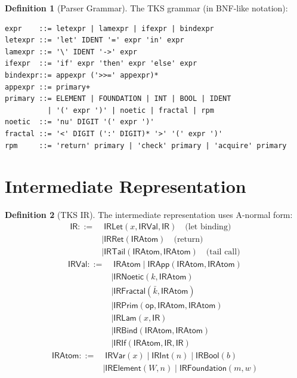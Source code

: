 \documentclass[11pt,twoside,openright]{book}
\theoremstyle{definition}
\newtheorem{definition}{Definition}[chapter]
\theoremstyle{plain}
\theoremstyle{remark}
\newcommand{\IR}{\mathsf{IR}}                %
\begin{document}
\begin{definition}[Parser Grammar]
\label{def:parser-grammar}
The TKS grammar (in BNF-like notation):
\begin{verbatim}
expr    ::= letexpr | lamexpr | ifexpr | bindexpr
letexpr ::= 'let' IDENT '=' expr 'in' expr
lamexpr ::= '\' IDENT '->' expr
ifexpr  ::= 'if' expr 'then' expr 'else' expr
bindexpr::= appexpr ('>>=' appexpr)*
appexpr ::= primary+
primary ::= ELEMENT | FOUNDATION | INT | BOOL | IDENT
          | '(' expr ')' | noetic | fractal | rpm
noetic  ::= 'nu' DIGIT '(' expr ')'
fractal ::= '<' DIGIT (':' DIGIT)* '>' '(' expr ')'
rpm     ::= 'return' primary | 'check' primary | 'acquire' primary
\end{verbatim}
\end{definition}

\section{Intermediate Representation}

\begin{definition}[TKS IR]
\label{def:tks-ir}
The intermediate representation uses A-normal form:
\begin{align}
\IR ::=&\; \mathsf{IRLet}(x, \mathsf{IRVal}, \IR) \quad \text{(let binding)} \\
    &\mid \mathsf{IRRet}(\mathsf{IRAtom}) \quad \text{(return)} \\
    &\mid \mathsf{IRTail}(\mathsf{IRAtom}, \mathsf{IRAtom}) \quad \text{(tail call)}
\end{align}
\begin{align}
\mathsf{IRVal} ::=&\; \mathsf{IRAtom} \mid \mathsf{IRApp}(\mathsf{IRAtom}, \mathsf{IRAtom}) \\
    &\mid \mathsf{IRNoetic}(k, \mathsf{IRAtom}) \\
    &\mid \mathsf{IRFractal}(\bar{k}, \mathsf{IRAtom}) \\
    &\mid \mathsf{IRPrim}(\mathsf{op}, \mathsf{IRAtom}, \mathsf{IRAtom}) \\
    &\mid \mathsf{IRLam}(x, \IR) \\
    &\mid \mathsf{IRBind}(\mathsf{IRAtom}, \mathsf{IRAtom}) \\
    &\mid \mathsf{IRIf}(\mathsf{IRAtom}, \IR, \IR)
\end{align}
\begin{align}
\mathsf{IRAtom} ::=&\; \mathsf{IRVar}(x) \mid \mathsf{IRInt}(n) \mid \mathsf{IRBool}(b) \\
    &\mid \mathsf{IRElement}(W, n) \mid \mathsf{IRFoundation}(m, w)
\end{align}
\end{definition}
\end{document}
